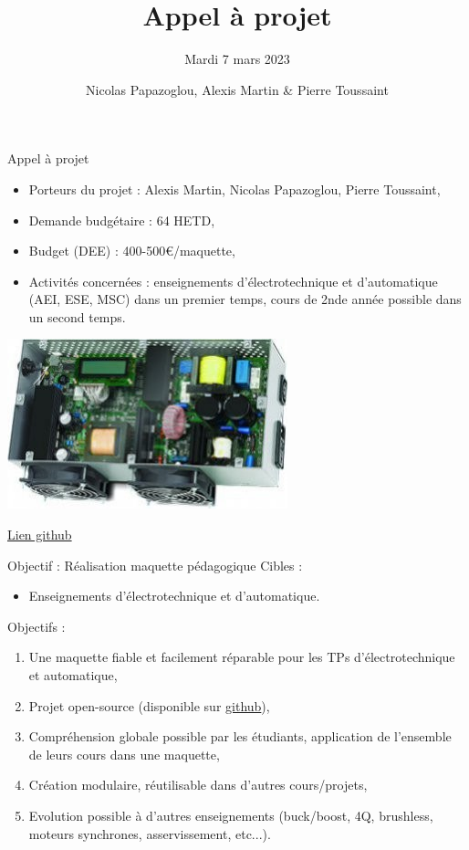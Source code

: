 \documentclass[aspectratio=169]{beamer}
\title{Appel à projet}
\subtitle{Mardi 7 mars 2023}
\date{}
\author[N.P. - A.M. - P.T.]{Nicolas Papazoglou, Alexis Martin \& Pierre Toussaint}
\institute[ENSEA]{ENSEA}
\begin{document}
\begin{frame}
	\titlepage
\end{frame}

\begin{frame}{Appel à projet}
\begin{minipage}{0.49\textwidth}
	\begin{itemize}
		\item Porteurs du projet : Alexis Martin, Nicolas Papazoglou, Pierre Toussaint,
		\item Demande budgétaire : 64 HETD,
		\item Budget (DEE) : 400-500\euro/maquette,
		\item Activités concernées : enseignements d'électrotechnique et d'automatique (AEI, ESE, MSC) dans un premier temps, cours de 2nde année possible dans un second temps.
	\end{itemize}
\end{minipage}
\begin{minipage}{0.49\textwidth}
	\includegraphics[scale=0.6]{figures/inverter.jpeg} 
\end{minipage}
\center \href{https://github.com/DBXYD/AAP_ENSEA_Inverter}{Lien github}
\end{frame}

\begin{frame}{Objectif : Réalisation maquette pédagogique}
	Cibles : 
	\begin{itemize}
		\item Enseignements d'électrotechnique et d'automatique.
	\end{itemize}
	Objectifs : 
	\begin{enumerate}
		\item Une maquette fiable et facilement réparable pour les TPs d'électrotechnique et automatique,
		\item Projet open-source (disponible sur \href{https://github.com/DBXYD/AAP_ENSEA_Inverter}{github}),
		\item Compréhension globale possible par les étudiants, application de l'ensemble de leurs cours dans une maquette,
		\item Création modulaire, réutilisable dans d'autres cours/projets, 
		\item Evolution possible à d'autres enseignements (buck/boost, 4Q, brushless, moteurs synchrones, asservissement, etc...).
	\end{enumerate}
\end{frame}
\end{document}
